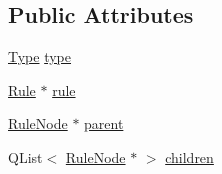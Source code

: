 \subsection*{Public Attributes}
\begin{DoxyCompactItemize}
\item 
\hyperlink{class_rule_node_af5559008a21eeb33044686b245f8e636}{Type} \hyperlink{class_rule_node_ae87a23283ab864a45dad3b6716751d5f}{type}
\item 
\hyperlink{class_rule}{Rule} $\ast$ \hyperlink{class_rule_node_a5102587db43bf3aede68ec0c24b60a7b}{rule}
\item 
\hyperlink{class_rule_node}{RuleNode} $\ast$ \hyperlink{class_rule_node_a125fb9f6655d872b9f0e7e1991023974}{parent}
\item 
QList$<$ \hyperlink{class_rule_node}{RuleNode} $\ast$ $>$ \hyperlink{class_rule_node_a94b912d0c01fa1cd77c2083c289356fc}{children}
\end{DoxyCompactItemize}


